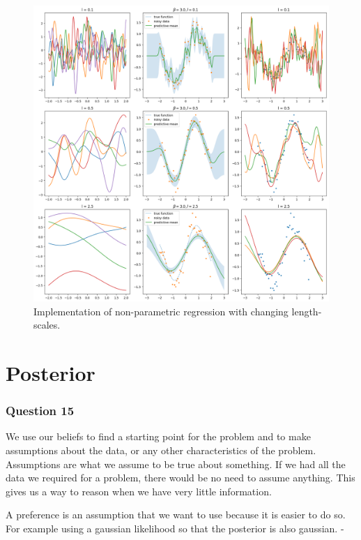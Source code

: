 \documentclass[10pt, a4paper, twocolumn]{article} %
\begin{document}

\begin{figure}[!htb]
\centerline{\includegraphics[width=\linewidth]{non_parametric_regression.png}}
\caption{Implementation of non-parametric regression with changing length-scales. }
\label{fig2}
\end{figure}

\section{Posterior}

\subsubsection*{Question 15}
We use our beliefs to find a starting point for the problem and to make assumptions about the data, or any other characteristics of the problem. Assumptions are what we assume to be true about something. If we had all the data we required for a problem, there would be no need to assume anything. This gives us a way to reason when we have very little information. \par
A preference is an assumption that we want to use because it is easier to do so. For example using a gaussian likelihood so that the posterior is also gaussian. -
\end{document}
